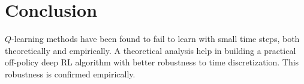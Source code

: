 \section{Conclusion}
$Q$-learning methods have been found to fail to learn with small time
steps, both theoretically and empirically. A theoretical analysis
help in building a practical off-policy deep RL algorithm with better robustness to time
discretization. This robustness is confirmed empirically.
% 
